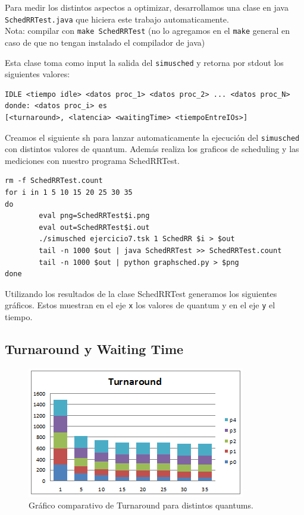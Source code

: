Para medir los distintos aspectos a optimizar, desarrollamos una clase en java \verb|SchedRRTest.java| que hiciera este trabajo automaticamente.\\
Nota: compilar con \verb|make SchedRRTest| (no lo agregamos en el \verb|make| general en caso de que no tengan instalado el compilador de java)

Esta clase toma como input la salida del \verb|simusched| y retorna por stdout los siguientes valores:

\begin{verbatim}
IDLE <tiempo idle> <datos proc_1> <datos proc_2> ... <datos proc_N>
donde: <datos proc_i> es
[<turnaround>, <latencia> <waitingTime> <tiempoEntreIOs>]
\end{verbatim}

Creamos el siguiente sh para lanzar automaticamente la ejecuci\'on del \verb|simusched| con distintos valores de quantum. Adem\'as realiza los graficos de scheduling y las mediciones con nuestro programa SchedRRTest.

\begin{framed}
\begin{verbatim}
rm -f SchedRRTest.count
for i in 1 5 10 15 20 25 30 35
do
        eval png=SchedRRTest$i.png
        eval out=SchedRRTest$i.out
        ./simusched ejercicio7.tsk 1 SchedRR $i > $out
        tail -n 1000 $out | java SchedRRTest >> SchedRRTest.count
        tail -n 1000 $out | python graphsched.py > $png
done
\end{verbatim}
\end{framed}

Utilizando los resultados de la clase SchedRRTest generamos los siguientes gr\'aficos. Estos muestran en el eje \verb|x| los valores de quantum y en el eje \verb|y| el tiempo.

\subsection{Turnaround y Waiting Time}
\begin{figure}[H]
  \centering
    \includegraphics{img/turnaround.png}
    \caption{Gr\'afico comparativo de Turnaround para distintos quantums.}
\end{figure}

